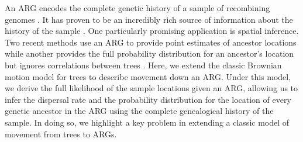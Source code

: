  
An ARG encodes the complete genetic history of a sample of recombining genomes \citep{Hudson1983, Griffiths1996, lewanski2023era}. It has proven to be an incredibly rich source of information about the history of the sample  \citep{harris2019database,hejase2020summary,lewanski2023era}. 
One particularly promising application is spatial inference.
Two recent methods use an ARG to provide point estimates of ancestor locations \citep{Wohns2022,grundler2024} while another provides the full probability distribution for an ancestor's location but ignores correlations between trees \citep{osmond2024estimating}.
Here, we extend the classic Brownian motion model for trees to describe movement down an ARG. Under this model, we derive the full likelihood of the sample locations given an ARG, allowing us to infer the dispersal rate and the probability distribution for the location of every genetic ancestor in the ARG using the complete genealogical history of the sample. In doing so, we highlight a key problem in extending a classic model of movement from trees to ARGs.


